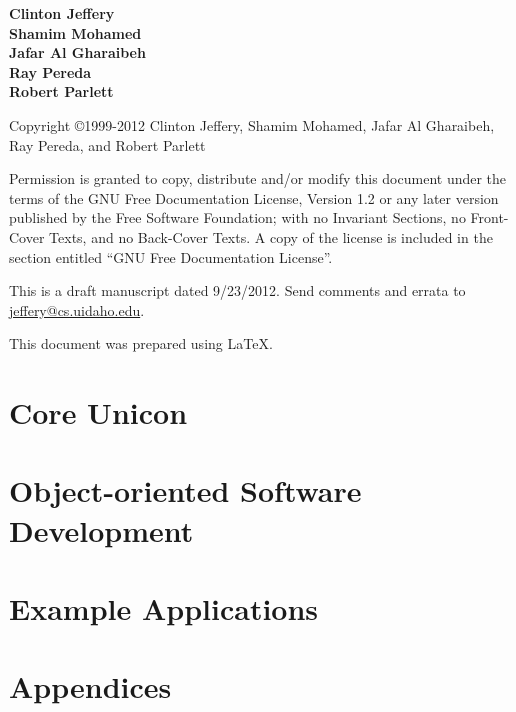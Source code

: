 \documentclass[letterpaper,twoside,12pt]{book}
\begin{document}
\bigskip
\bigskip
\bigskip
\bigskip
\bigskip
\bigskip
\bigskip

\begin{flushright}\bfseries
Clinton Jeffery \\
Shamim Mohamed \\
Jafar Al Gharaibeh \\
Ray Pereda \\
Robert Parlett 
\end{flushright}
\clearpage

\thispagestyle{empty}
\bigskip
\bigskip
Copyright \copyright 1999-2012 Clinton Jeffery, Shamim Mohamed, Jafar Al Gharaibeh, Ray
Pereda, and Robert Parlett

Permission is granted to copy, distribute and/or modify this document under the
terms of the GNU Free Documentation License, Version 1.2 or any later version
published by the Free Software Foundation; with no Invariant Sections, no
Front-Cover Texts, and no Back-Cover Texts. A copy of the license is included in
the section entitled ``GNU Free Documentation License''.
\bigskip

This is a draft manuscript dated 9/23/2012.  Send comments and errata
to \href{mailto:jeffery@cs.uidaho.edu}{jeffery@cs.uidaho.edu}.

\bigskip
This document was prepared using \LaTeX.
\clearpage

\frontmatter
\setcounter{tocdepth}{2}
\tableofcontents


\mainmatter



\part{Core Unicon}











\part{Object-oriented Software Development}







\part{Example Applications}









\part{Appendices}
\appendix






% 

\backmatter


\small
\printindex
\end{document}
